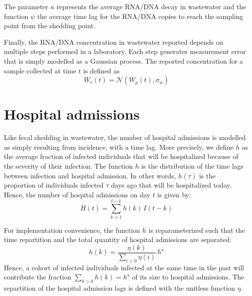 \documentclass[11pt]{article} %
\newcommand{\warning}[1]{\textcolor{RedOrange}{\textbf{#1}}}
\begin{document}
The parameter $\kappa$ represents the average RNA/DNA decay in wastewater and the function $\psi$ the average time lag for the RNA/DNA copies to reach the sampling point from the shedding point.

Finally, the RNA/DNA concentration in wastewater reported depends on multiple steps performed in a laboratory. Each step generates measurement error that is simply modelled as a Gaussian process. 
The reported concentration for a sample collected at time $t$ is defined as
\begin{equation}
W_r(t) = \mathcal{N}(W_p(t), \sigma_w)
\end{equation}



\section{Hospital admissions}

Like fecal shedding in wastewater, the number of hospital admissions is modelled as simply resulting from incidence, with a time lag. 
More precisely, we define $h$ as the average fraction of infected individuals that will be hospitalized because of the severity of their infection. 
The function $h$ is the distribution of the time lags between infection and hospital admission. In other words, $h(\tau)$ is the proportion of individuals infected $\tau$ days ago that will be hospitalized today. 
Hence, the number of hospital admissions on day $t$ is given by:
\begin{equation}
H(t) = \sum_{k=1}^{t-1} h(k) \, I(t-k)
\end{equation}

For implementation convenience, the function $h$ is reparameterized such that the time repartition and the total quantity of hospital admissions are separated:
\begin{equation}
h(k) = \frac{\eta(k)}{\sum_{i>0}\eta(i)} \, h^\star
\end{equation}
Hence, a cohort of infected individuals infected at the same time in the past will contribute the fraction $\sum_{k>0} h(k) =  h^\star$ of its size to hospital admissions. The repartition of the hospital admission lags is defined with the unitless function $\eta$.

%
%
%
%
%
%
\end{document}
